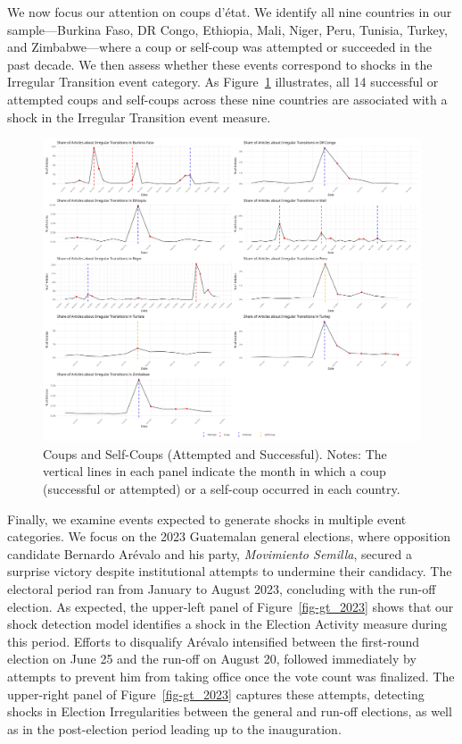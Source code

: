 \documentclass[
  letterpaper,
  DIV=11,
  numbers=noendperiod]{scrartcl}
\begin{document}
We now focus our attention on coups d'état. We identify all nine
countries in our sample---Burkina Faso, DR Congo, Ethiopia, Mali, Niger,
Peru, Tunisia, Turkey, and Zimbabwe---where a coup or self-coup was
attempted or succeeded in the past decade. We then assess whether these
events correspond to shocks in the Irregular Transition event category.
As Figure~\ref{fig-coups_9} illustrates, all 14 successful or attempted
coups and self-coups across these nine countries are associated with a
shock in the Irregular Transition event measure.

\begin{figure}

{\centering \includegraphics{event_validation/Combined_Coup_Plots.png}

}

\caption{\label{fig-coups_9}Coups and Self-Coups (Attempted and
Successful). Notes: The vertical lines in each panel indicate the month
in which a coup (successful or attempted) or a self-coup occurred in
each country.}

\end{figure}

Finally, we examine events expected to generate shocks in multiple event
categories. We focus on the 2023 Guatemalan general elections, where
opposition candidate Bernardo Arévalo and his party, \emph{Movimiento
Semilla}, secured a surprise victory despite institutional attempts to
undermine their candidacy. The electoral period ran from January to
August 2023, concluding with the run-off election. As expected, the
upper-left panel of Figure~\ref{fig-gt_2023} shows that our shock
detection model identifies a shock in the Election Activity measure
during this period. Efforts to disqualify Arévalo intensified between
the first-round election on June 25 and the run-off on August 20,
followed immediately by attempts to prevent him from taking office once
the vote count was finalized. The upper-right panel of
Figure~\ref{fig-gt_2023} captures these attempts, detecting shocks in
Election Irregularities between the general and run-off elections, as
well as in the post-election period leading up to the inauguration.
\end{document}
